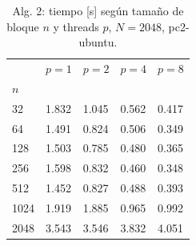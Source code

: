 \begin{table}[H]
\centering\small
\caption{Alg. 2: tiempo [s] según tamaño de bloque $n$ y threads $p$, $N=2048$, pc2-ubuntu.}
\label{tab:e_alg2_bloques_pc2-ubuntu}
\begin{tabular}{lllll}
\toprule
 & $p=1$ & $p=2$ & $p=4$ & $p=8$ \\
$n$ &  &  &  &  \\
\midrule
32 & 1.832 & 1.045 & 0.562 & 0.417 \\
64 & 1.491 & 0.824 & 0.506 & 0.349 \\
128 & 1.503 & 0.785 & 0.480 & 0.365 \\
256 & 1.598 & 0.832 & 0.460 & 0.348 \\
512 & 1.452 & 0.827 & 0.488 & 0.393 \\
1024 & 1.919 & 1.885 & 0.965 & 0.992 \\
2048 & 3.543 & 3.546 & 3.832 & 4.051 \\
\bottomrule
\end{tabular}
\end{table}
